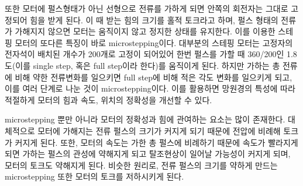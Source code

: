 또한 모터에 펄스형태가 아닌 선형으로 전류를 가하게 되면 안쪽의 회전자는 그대로 고정되어 힘을 받게 된다. 이 때 받는 힘의 크기를 홀적 토크라고 하며, 펄스 형태의 전류가 가해지지 않으면 모터는 움직이지 않고 정지한 상태를 유지한다. 이를 이용한 스테핑 모터의 또다른 특징이 바로 microstepping이다. 대부분의 스테핑 모터는 고정자의 전자석이 배치된 개수가 200개로 고정이 되어있어 한번 펄스를 가할 때 360/200인 1.8도(이를 single step, 혹은 full step이라 한다)를 움직이게 된다. 하지만 가하는 총 전류에 비해 약한 전류변화를 일으키면 full step에 비해 적은 각도 변화를 일으키게 되고, 이를 여러 단계로 나눈 것이 microstepping이다. 이를 활용하면 망원경의 특성에 따라 적절하게 모터의 힘과 속도, 위치의 정확성을 개선할 수 있다.

microstepping 뿐만 아니라 모터의 정확성과 힘에 관여하는 요소는 많이 존재한다. 대체적으로  모터에 가해지는 전류 펄스의 크기가 커지게 되기 때문에 전압에 비례해 토크가 커지게 된다. 또한, 모터의 속도는 가한 총 펄스에 비례하기 때문에 속도가 빨라지게 되면 가하는 펄스의 관성에 약해지게 되고 탈조현상이 일어날 가능성이 커지게 되며, 모터의 토크도 약해지게 된다. 비슷한 원리로, 전류 펄스의 크기를 약하게 만드는 microstepping 또한 모터의 토크를 저하시키게 된다.
